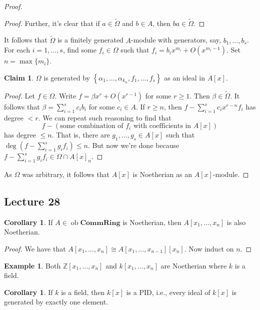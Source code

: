 \documentclass[10pt,letterpaper,cm]{nupset}
\theoremstyle{definition}
\newtheorem{exmp}[definition]{Example}
\theoremstyle{theorem}
\newtheorem{corollary}[definition]{Corollary}
\newtheorem*{claim}{Claim}
\theoremstyle{remark}
\newcommand{\Z}{\mathbb Z}
\newcommand{\1}{\mathbf{1}}
\newcommand{\0}{\vec 0}
\DeclareMathOperator{\ob}{ob}
\begin{document}
\begin{proof}
\begin{proof}
Further, it's clear that if $a\in \widetilde{\Omega}$ and $b\in A$, then $ba\in \widetilde{\Omega}$. 
\end{proof}
It follows that $\widetilde{\Omega}$ is a finitely generated $A$-module with generators, say, $b_1, \ldots, b_s$. For each $i=1, \ldots, s$, find some $f_i \in \Omega$ such that $f_i = b_ix^{m_i} + O(x^{m_i-1})$. Set $n= \max\{m_i\}$.
\begin{claim}
$\Omega$ is generated by $\left\{\alpha_1, \ldots, \alpha_{k_n}, f_1, \ldots, f_s\right\}$ as an ideal in $A\left[x\right]$.
\end{claim}
\begin{proof}
Let $f\in \Omega$. Write $f = \beta x^r + O(x^{r-1})$ for some $r \geq 1$. Then $\beta \in \widetilde{\Omega}$. It follows that $\beta = \sum_{i=1}^s c_ib_i$ for some $c_i \in A$. If $r \geq n$, then $f -\sum_{i=1}^s c_ix^{r-n}f_i$ has degree $< r$. We can repeat such reasoning to find that $$f - \left(\text{some combination of } f_i \text{ with coefficients in } A\left[x\right]\right)$$ has degree $\leq n$. That is, there are $g_1, \ldots, g_s \in A\left[x\right]$ such that $\deg\left(f - \sum_{i=1}^sg_if_i\right) \leq n$. But now we're done because $f - \sum_{i=1}^sg_if_i \in \Omega \cap A\left[x\right]_n$.
\end{proof}$ $As $\Omega$ was arbitrary, it follows that $A\left[x\right]$ is Noetherian as an $A\left[x\right]$-module. 
\end{proof}

\subsection{Lecture 28}

\begin{corollary}\label{pc2}
If $A \in \ob \mathbf{CommRing}$ is Noetherian, then $A\left[x_1, \ldots, x_n\right]$ is also Noetherian.
\end{corollary}
\begin{proof}
We have that $A\left[x_1, \ldots, x_n\right] \cong A\left[x_1, \ldots, x_{n-1}\right]\left[x_n\right]$. Now induct on $n$.
\end{proof}

\begin{exmp}
Both $\Z\left[x_1, \ldots, x_n\right]$ and $k\left[x_1, \ldots, x_n\right]$ are Noetherian where $k$ is a field.
\end{exmp}

\begin{corollary}
If $k$ is a field, then $k\left[x\right]$ is a PID, i.e., every ideal of $k\left[x\right]$ is generated by exactly one element.
\end{corollary}
\end{document}
